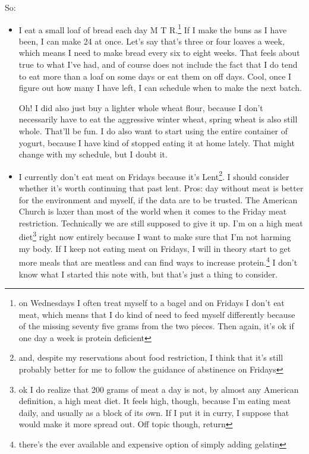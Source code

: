 \documentclass[12pt]{article}[titlepage]
\renewcommand{\,}{\textsuperscript{,}}
\begin{document}
So:  
\begin{itemize}  
\item I eat a small loaf of bread each day M T R.\footnote{on Wednesdays I often treat myself to a bagel and on Fridays I don't eat meat, which means that I do kind of need to feed myself differently because of the missing seventy five grams from the two pieces. Then again, it's ok if one day a week is protein deficient}  
If I make the buns as I have been, I can make 24 at once.  
Let's say that's three or four loaves a week, which means I need to make bread every six to eight weeks.  
That feels about true to what I've had, and of course does not include the fact that I do tend to eat more than a loaf on some days or eat them on off days.  
Cool, once I figure out how many I have left, I can schedule when to make the next batch.

Oh! I did also just buy a lighter whole wheat flour, because I don't necessarily have to eat the aggressive winter wheat, spring wheat is also still whole.  
That'll be fun.  
I do also want to start using the entire container of yogurt, because I have kind of stopped eating it at home lately.  
That might change with my schedule, but I doubt it.

\item I currently don't eat meat on Fridays because it's Lent\footnote{and, despite my reservations about food restriction, I think that it's still probably better for me to follow the guidance of abstinence on Fridays}. I should consider whether it's worth continuing that past lent.  
Pros: day without meat is better for the environment and myself, if the data are to be trusted.  
The American Church is laxer than most of the world when it comes to the Friday meat restriction.  
Technically we are still supposed to give it up.  
I'm on a high meat diet\footnote{ok I do realize that 200 grams of meat a day is not, by almost any American definition, a high meat diet.  
It feels high, though, because I'm eating meat daily, and usually as a block of its own.  
If I put it in curry, I suppose that would make it more spread out.  
Off topic though, return} right now entirely because I want to make sure that I'm not harming my body.  
If I keep not eating meat on Fridays, I will in theory start to get more meals that are meatless and can find ways to increase protein.\footnote{there's the ever available and expensive option of simply adding gelatin}  
I don't know what I started this note with, but that's just a thing to consider.


\end{itemize}
\end{document}
